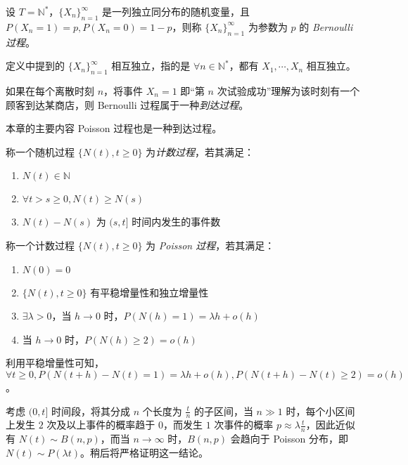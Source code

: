 \documentclass[../main.tex]{subfiles}
\begin{document}
\begin{definition}\label{def:6.1.1}
    设 $T=\mathbb N^*$，$\{X_n\}_{n=1}^\infty$ 是一列独立同分布的随机变量，且 $P(X_n=1)=p,P(X_n=0)=1-p$，则称 $\{X_n\}_{n=1}^\infty$ 为参数为 $p$ 的 \emph{Bernoulli 过程}。
\end{definition}

定义中提到的 $\{X_n\}_{n=1}^\infty$ 相互独立，指的是 $\forall n\in\mathbb N^*$，都有 $X_1,\cdots,X_n$ 相互独立。

如果在每个离散时刻 $n$，将事件 $X_n=1$ 即“第 $n$ 次试验成功”理解为该时刻有一个顾客到达某商店，则 Bernoulli 过程属于一种\emph{到达过程}。

本章的主要内容 Poisson 过程也是一种到达过程。

\begin{definition}\label{def:6.1.2}
    称一个随机过程 $\{N(t),t\geq0\}$ 为\emph{计数过程}，若其满足：
    \begin{enumerate}
        \item $N(t)\in\mathbb N$
        \item $\forall t>s\geq0,N(t)\geq N(s)$
        \item $N(t)-N(s)$ 为 $(s,t]$ 时间内发生的事件数
    \end{enumerate}
\end{definition}

\begin{definition}\label{def:6.1.3}
    称一个计数过程 $\{N(t),t\geq0\}$ 为 \emph{Poisson 过程}，若其满足：
    \begin{enumerate}
        \item $N(0)=0$
        \item $\{N(t),t\geq0\}$ 有平稳增量性和独立增量性
        \item $\exists\lambda>0$，当 $h\rightarrow0$ 时，$P(N(h)=1)=\lambda h+o(h)$
        \item 当 $h\rightarrow0$ 时，$P(N(h)\geq2)=o(h)$
    \end{enumerate}
\end{definition}

利用平稳增量性可知，$\forall t\geq0,P(N(t+h)-N(t)=1)=\lambda h+o(h),P(N(t+h)-N(t)\geq2)=o(h)$。

考虑 $(0,t]$ 时间段，将其分成 $n$ 个长度为 $\frac tn$ 的子区间，当 $n\gg1$ 时，每个小区间上发生 $2$ 次及以上事件的概率趋于 $0$，而发生 $1$ 次事件的概率 $p\approx \lambda\frac tn$，因此近似有 $N(t)\sim B(n,p)$，而当 $n\rightarrow\infty$ 时，$B(n,p)$ 会趋向于 Poisson 分布，即 $N(t)\sim P(\lambda t)$。稍后将严格证明这一结论。
\end{document}
